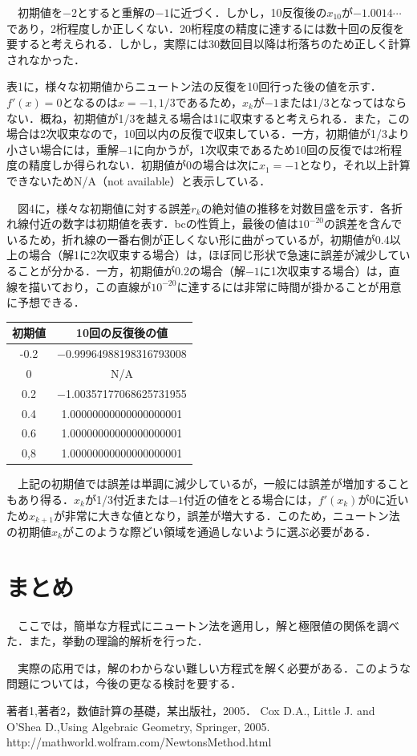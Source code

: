 \documentclass[a4j,11pt]{jarticle}
\begin{document}
　初期値を$-2$とすると重解の$-1$に近づく．しかし，10反復後の$x_{10}$が$-1.0014\cdots$であり，2桁程度しか正しくない．20桁程度の精度に達するには数十回の反復を要すると考えられる．しかし，実際には30数回目以降は桁落ちのため正しく計算されなかった．

表1に，様々な初期値からニュートン法の反復を10回行った後の値を示す．$f'(x)=0$となるのは$x=-1,1/3$であるため，$x_k$が$-1$または$1/3$となってはならない．概ね，初期値が1/3を越える場合は1に収束すると考えられる．また，この場合は2次収束なので，10回以内の反復で収束している．一方，初期値が1/3より小さい場合には，重解$-1$に向かうが，1次収束であるため10回の反復では2桁程度の精度しか得られない．初期値が0の場合は次に$x_1=-1$となり，それ以上計算できないためN/A（not available）と表示している．

　図4に，様々な初期値に対する誤差$r_k$の絶対値の推移を対数目盛を示す．各折れ線付近の数字は初期値を表す．bcの性質上，最後の値は$10^{-20}$の誤差を含んでいるため，折れ線の一番右側が正しくない形に曲がっているが，初期値が0.4以上の場合（解1に2次収束する場合）は，ほぼ同じ形状で急速に誤差が減少していることが分かる．一方，初期値が0.2の場合（解$-1$に1次収束する場合）は，直線を描いており，この直線が$10^{-20}$に達するには非常に時間が掛かることが用意に予想できる．
\begin{center}
\begin{tabular}{c|c}
\hline
初期値&10回の反復後の値\\
\hline
-0.2&−0.99964988198316793008\\
0&N/A\\
0.2&−1.00357177068625731955\\
0.4&1.00000000000000000001\\
0.6&1.00000000000000000001\\
0,8&1.00000000000000000001\\
\hline
\end{tabular}
\end{center}
　上記の初期値では誤差は単調に減少しているが，一般には誤差が増加することもあり得る．$x_k$が1/3付近または$-1$付近の値をとる場合には，$f'(x_k)$が0に近いため$x_{k+1}$が非常に大きな値となり，誤差が増大する．このため，ニュートン法の初期値$x_k$がこのような際どい領域を通過しないように選ぶ必要がある．
\section{まとめ}
　ここでは，簡単な方程式にニュートン法を適用し，解と極限値の関係を調べた．また，挙動の理論的解析を行った．

　実際の応用では，解のわからない難しい方程式を解く必要がある．このような問題については，今後の更なる検討を要する．

\begin{thebibliography}{99}
 著者1,著者2，数値計算の基礎，某出版社，2005．
 Cox D.A., Little J. and O'Shea D.,Using Algebraic Geometry, Springer, 2005.
 http://mathworld.wolfram.com/NewtonsMethod.html
\end{thebibliography}
\end{document}

